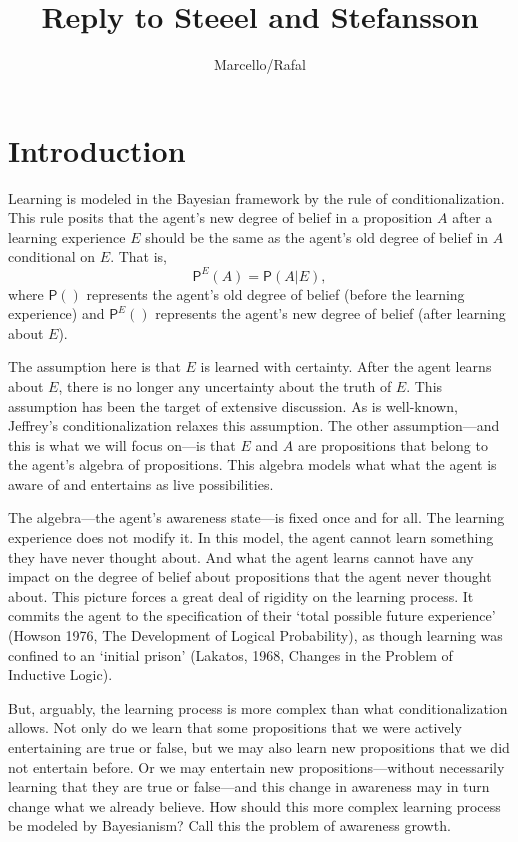 \documentclass[
  11pt,
  dvipsnames,enabledeprecatedfontcommands]{scrartcl}
\title{Reply to Steeel and Stefansson}
\author{Marcello/Rafal}
\date{}
\newcommand{\pr}[1]{\ensuremath{\mathsf{P}(#1)}}
\newcommand{\ppr}[2]{\ensuremath{\mathsf{P}^{#1}(#2)}}
\begin{document}
\maketitle

\hypertarget{introduction}{%
\section{Introduction}\label{introduction}}

Learning is modeled in the Bayesian framework by the rule of
conditionalization. This rule posits that the agent's new degree of
belief in a proposition \(A\) after a learning experience \(E\) should
be the same as the agent's old degree of belief in \(A\) conditional on
\(E\). That is, \[\ppr{E}{A}=\pr{A \vert E},\] where \(\pr{}\)
represents the agent's old degree of belief (before the learning
experience) and \(\ppr{E}{}\) represents the agent's new degree of
belief (after learning about \(E\)).

The assumption here is that \(E\) is learned with certainty. After the
agent learns about \(E\), there is no longer any uncertainty about the
truth of \(E\). This assumption has been the target of extensive
discussion. As is well-known, Jeffrey's conditionalization relaxes this
assumption. The other assumption---and this is what we will focus
on---is that \(E\) and \(A\) are propositions that belong to the agent's
algebra of propositions. This algebra models what what the agent is
aware of and entertains as live possibilities.

The algebra---the agent's awareness state---is fixed once and for all.
The learning experience does not modify it. In this model, the agent
cannot learn something they have never thought about. And what the agent
learns cannot have any impact on the degree of belief about propositions
that the agent never thought about. This picture forces a great deal of
rigidity on the learning process. It commits the agent to the
specification of their `total possible future experience' (Howson 1976,
The Development of Logical Probability), as though learning was confined
to an `initial prison' (Lakatos, 1968, Changes in the Problem of
Inductive Logic).

But, arguably, the learning process is more complex than what
conditionalization allows. Not only do we learn that some propositions
that we were actively entertaining are true or false, but we may also
learn new propositions that we did not entertain before. Or we may
entertain new propositions---without necessarily learning that they are
true or false---and this change in awareness may in turn change what we
already believe. How should this more complex learning process be
modeled by Bayesianism? Call this the problem of awareness growth.
\end{document}
